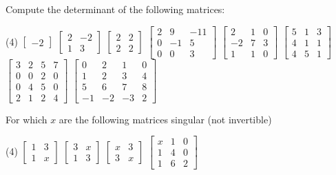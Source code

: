 \begin{exercise}
Compute the determinant of the following matrices:
\begin{tasks}(4)
\task
$\begin{bmatrix}
-2
\end{bmatrix}$
\task
$\begin{bmatrix}
2 & -2 \\
1 & 3
\end{bmatrix}$
\task
$\begin{bmatrix}
2 & 2 \\
2 & 2
\end{bmatrix}$
\task
$\begin{bmatrix}
2 & 9 & -11 \\
0 & -1 & 5 \\
0 & 0 & 3
\end{bmatrix}$
\task
$\begin{bmatrix}
2 & 1 & 0 \\
-2 & 7 & 3 \\
1 & 1 & 0
\end{bmatrix}$
\task
$\begin{bmatrix}
5 & 1 & 3 \\
4 & 1 & 1 \\
4 & 5 & 1
\end{bmatrix}$
\task
$\begin{bmatrix}
3 & 2 & 5 & 7 \\
0 & 0 & 2 & 0 \\
0 & 4 & 5 & 0 \\
2 & 1 & 2 & 4
\end{bmatrix}$
\task
$\begin{bmatrix}
 0 &  2 &  1 & 0 \\
 1 &  2 &  3 & 4 \\
 5 &  6 &  7 & 8 \\
-1 & -2 & -3 & 2
\end{bmatrix}$
\end{tasks}
\end{exercise}

\begin{exercise}
For which $x$ are the following matrices singular (not invertible)
\begin{tasks}(4)
\task
$\begin{bmatrix}
1 & 3 \\
1 & x
\end{bmatrix}$
\task
$\begin{bmatrix}
3 & x \\
1 & 3
\end{bmatrix}$
\task
$\begin{bmatrix}
x & 3 \\
3 & x
\end{bmatrix}$
\task
$\begin{bmatrix}
x & 1 & 0 \\
1 & 4 & 0 \\
1 & 6 & 2
\end{bmatrix}$
\end{tasks}
\end{exercise}

